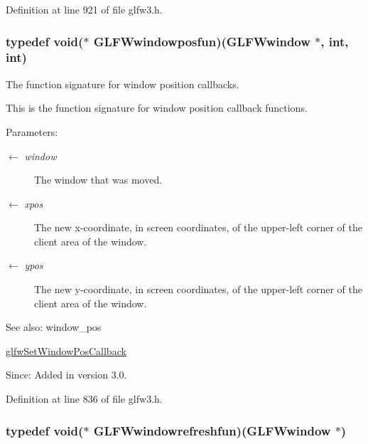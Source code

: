 Definition at line 921 of file glfw3.h.\hypertarget{group__window_g1c36e52549efd47790eb3f324da71924}{
\subsubsection[GLFWwindowposfun]{\setlength{\rightskip}{0pt plus 5cm}typedef void($\ast$  {\bf GLFWwindowposfun})({\bf GLFWwindow} $\ast$, int, int)}}
\label{group__window_g1c36e52549efd47790eb3f324da71924}


The function signature for window position callbacks. 

This is the function signature for window position callback functions.

\begin{Desc}
\item[Parameters:]
\begin{description}
\item[\mbox{$\leftarrow$} {\em window}]The window that was moved. \item[\mbox{$\leftarrow$} {\em xpos}]The new x-coordinate, in screen coordinates, of the upper-left corner of the client area of the window. \item[\mbox{$\leftarrow$} {\em ypos}]The new y-coordinate, in screen coordinates, of the upper-left corner of the client area of the window.\end{description}
\end{Desc}
\begin{Desc}
\item[See also:]window\_\-pos 

\hyperlink{group__window_gea610899c4cb070dcd655c6de1fe1d2c}{glfwSetWindowPosCallback}\end{Desc}
\begin{Desc}
\item[Since:]Added in version 3.0. \end{Desc}


Definition at line 836 of file glfw3.h.\hypertarget{group__window_g16764f89bf2060e6fa477f0943e1412b}{
\subsubsection[GLFWwindowrefreshfun]{\setlength{\rightskip}{0pt plus 5cm}typedef void($\ast$  {\bf GLFWwindowrefreshfun})({\bf GLFWwindow} $\ast$)}}
\label{group__window_g16764f89bf2060e6fa477f0943e1412b}


